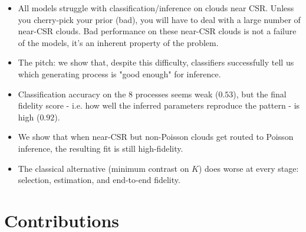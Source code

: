 \documentclass[11pt]{article}
\begin{document}
\begin{itemize}
    \item All models struggle with classification/inference on clouds near CSR. Unless you cherry-pick your prior (bad), you will have to deal with a large number of near-CSR clouds. Bad performance on these near-CSR clouds is not a failure of the models, it's an inherent property of the problem. 

    \item The pitch: we show that, despite this difficulty, classifiers successfully tell us which generating process is "good enough" for inference.

    \item Classification accuracy on the 8 processes seems weak ($0.53$), but the final fidelity score - i.e. how well the inferred parameters reproduce the pattern - is high ($0.92$).

    \item We show that when near-CSR but non-Poisson clouds get routed to Poisson inference, the resulting fit is still high-fidelity.

    \item The classical alternative (minimum contrast on $K$) does worse at every stage: selection, estimation, and end-to-end fidelity.
\end{itemize}

\newpage


\section*{Contributions}
\end{document}
